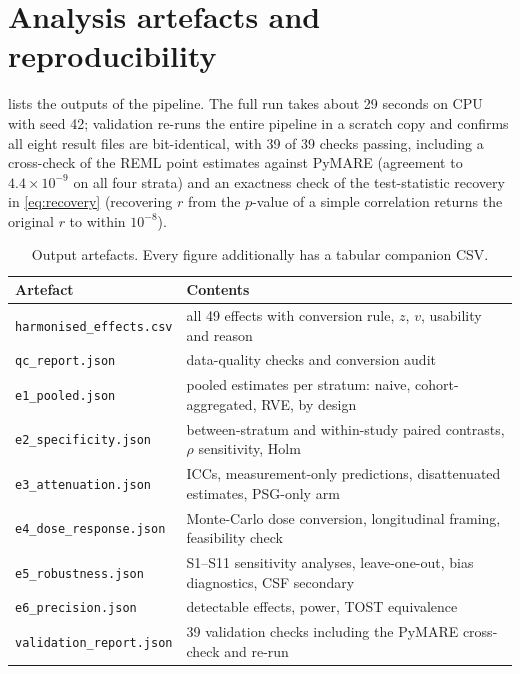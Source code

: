 \section{Analysis artefacts and reproducibility}
\label{app:artifacts}

 lists the outputs of the pipeline. The full run takes about 29 seconds on
CPU with seed 42; validation re-runs the entire pipeline in a scratch copy and confirms all eight
result files are bit-identical, with 39 of 39 checks passing, including a cross-check of the REML
point estimates against PyMARE (agreement to $4.4 \times 10^{-9}$ on all four strata) and an
exactness check of the test-statistic recovery in \eqref{eq:recovery} (recovering $r$ from the
$p$-value of a simple correlation returns the original $r$ to within $10^{-8}$).

\begin{table}[h]
    \centering
    \small
    \begin{tabular}{@{}ll@{}}
        \toprule
        \textbf{Artefact} & \textbf{Contents} \\
        \midrule
        \texttt{harmonised\_effects.csv} & all 49 effects with conversion rule, $z$, $v$, usability and reason \\
        \texttt{qc\_report.json}         & data-quality checks and conversion audit \\
        \texttt{e1\_pooled.json}         & pooled estimates per stratum: naive, cohort-aggregated, RVE, by design \\
        \texttt{e2\_specificity.json}    & between-stratum and within-study paired contrasts, $\rho$ sensitivity, Holm \\
        \texttt{e3\_attenuation.json}    & ICCs, measurement-only predictions, disattenuated estimates, PSG-only arm \\
        \texttt{e4\_dose\_response.json} & Monte-Carlo dose conversion, longitudinal framing, feasibility check \\
        \texttt{e5\_robustness.json}     & S1--S11 sensitivity analyses, leave-one-out, bias diagnostics, CSF secondary \\
        \texttt{e6\_precision.json}      & detectable effects, power, TOST equivalence \\
        \texttt{validation\_report.json} & 39 validation checks including the PyMARE cross-check and re-run \\
        \bottomrule
    \end{tabular}
    \caption{Output artefacts. Every figure additionally has a tabular companion CSV.}
    \label{tab:artifacts}
\end{table}


